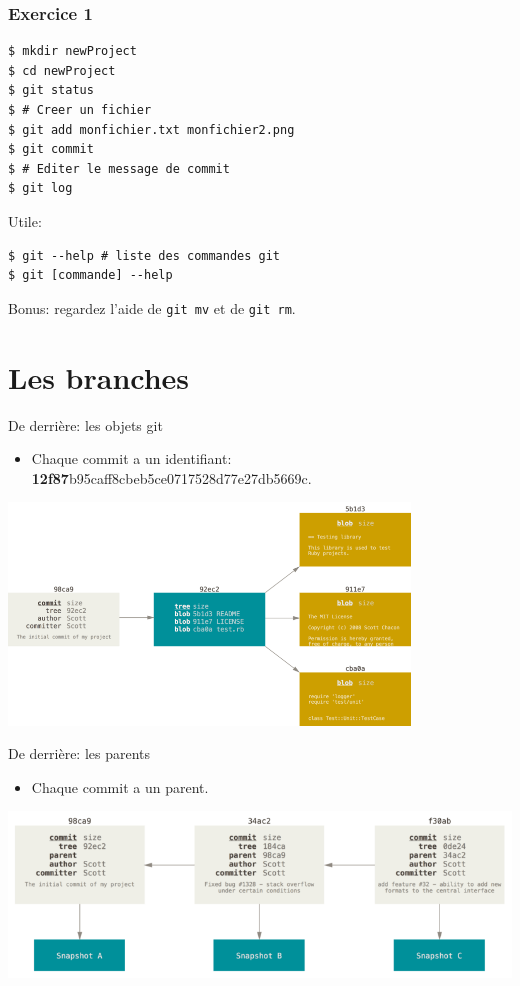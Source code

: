 \documentclass{beamer}
\begin{document}
\begin{frame}[fragile]
\frametitle{Exercice 1}
\begin{lstlisting}
$ mkdir newProject
$ cd newProject
$ git status
$ # Creer un fichier
$ git add monfichier.txt monfichier2.png
$ git commit
$ # Editer le message de commit
$ git log
\end{lstlisting}
Utile:
\begin{lstlisting}
$ git --help # liste des commandes git
$ git [commande] --help
\end{lstlisting}
Bonus: regardez l'aide de \texttt{git mv} et de \texttt{git rm}.
\end{frame}

\section{Les branches}

\begin{frame}{De derrière: les objets git}
    \begin{itemize}
        \item Chaque commit a un identifiant: \textbf{12f87}b95caff8cbeb5ce0717528d77e27db5669c.
    \end{itemize}
    \begin{center}
    \includegraphics[width=0.8\textwidth]{img/commit-and-tree.png}
    \end{center}
\end{frame}

\begin{frame}{De derrière: les parents}
    \begin{itemize}
        \item Chaque commit a un parent.
    \end{itemize}
    \includegraphics[width=\textwidth]{img/commits-and-parents.png}
\end{frame}
\end{document}

